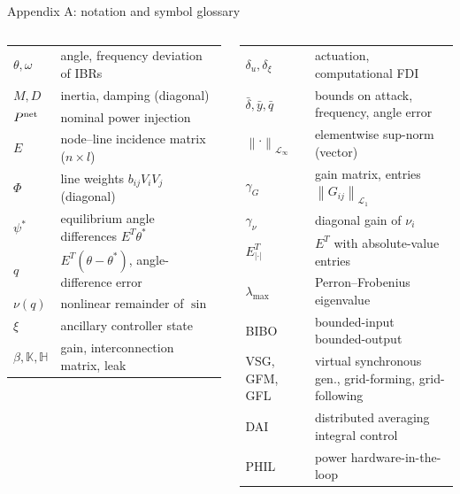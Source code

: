 \documentclass[aspectratio=169,9pt]{beamer}
\newcommand{\bbK}{\mathbb{K}}
\newcommand{\bbH}{\mathbb{H}}
\newcommand{\norm}[1]{\left\|#1\right\|}
\newcommand{\Linf}{\mathcal{L}_\infty}
\newcommand{\Lone}{\mathcal{L}_1}
\begin{document}
\begin{frame}[t]{Appendix A: notation and symbol glossary}
\scriptsize
\begin{columns}[T]
\begin{tabular}{@{}p{1.5cm}p{5.2cm}@{}}
\toprule
$\theta,\omega$ & angle, frequency deviation of IBRs\\
$M,D$ & inertia, damping (diagonal)\\
$P^{\rm net}$ & nominal power injection\\
$E$ & node--line incidence matrix ($n\times l$)\\
$\Phi$ & line weights $b_{ij}V_iV_j$ (diagonal)\\
$\psi^*$ & equilibrium angle differences $E^T\theta^*$\\
$q$ & $E^T(\theta-\theta^*)$, angle-difference error\\
$\nu(q)$ & nonlinear remainder of $\sin$\\
$\xi$ & ancillary controller state\\
$\beta,\bbK,\bbH$ & gain, interconnection matrix, leak\\
\bottomrule
\end{tabular}
\begin{tabular}{@{}p{1.5cm}p{5.2cm}@{}}
\toprule
$\delta_u,\delta_\xi$ & actuation, computational FDI\\
$\bar\delta,\bar y,\bar q$ & bounds on attack, frequency, angle error\\
$\norm{\cdot}_{\Linf}$ & elementwise sup-norm (vector)\\
$\gamma_G$ & gain matrix, entries $\norm{G_{ij}}_{\Lone}$\\
$\gamma_\nu$ & diagonal gain of $\nu_i$\\
$E^T_{|\cdot|}$ & $E^T$ with absolute-value entries\\
$\lambda_{\max}$ & Perron--Frobenius eigenvalue\\
BIBO & bounded-input bounded-output\\
VSG, GFM, GFL & virtual synchronous gen., grid-forming, grid-following\\
DAI & distributed averaging integral control\\
PHIL & power hardware-in-the-loop\\
\bottomrule
\end{tabular}
\end{columns}
\end{frame}
\end{document}

